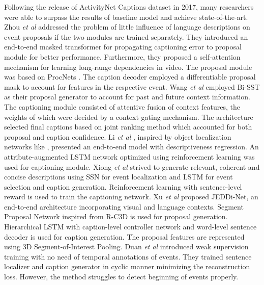 \par Following the release of ActivityNet Captions dataset in 2017, many researchers were able to surpass the results of baseline model and achieve state-of-the-art. Zhou \textit{et al} \cite{zhou2018end} addressed the problem of little influence of language descriptions on event proposals if the two modules are trained separately. They introduced an end-to-end masked transformer for propagating captioning error to proposal module for better performance. Furthermore, they proposed a self-attention mechanism for learning long-range dependencies in video. The proposal module was based on ProcNets \cite{zhou2017automatic}. The caption decoder employed a differentiable proposal mask to account for features in the respective event. Wang \textit{et al} \cite{wang2018bidirectional} employed Bi-SST as their proposal generator to account for past and future context information. The captioning module consisted of attentive fusion of context features, the weights of which were decided by a context gating mechanism. The architecture selected final captions based on joint ranking method which accounted for both proposal and caption confidence. Li \textit{et al} \cite{li2018jointly}, inspired by object localization networks like \cite{ren2016faster, liu2016ssd}, presented an end-to-end model with descriptiveness regression. An attribute-augmented LSTM network optimized using reinforcement learning was used for captioning module. Xiong \textit{et al} \cite{xiong2018forward} strived to generate relevant, coherent and concise descriptions using SSN \cite{zhao2017temporal} for event localization and LSTM for event selection and caption generation. Reinforcement learning with sentence-level reward is used to train the captioning network. Xu \textit{et al} \cite{xu2018joint} proposed JEDDi-Net, an end-to-end architecture incorporating visual and language contexts. Segment Proposal Network inspired from R-C3D \cite{xu2017rc3d} is used for proposal generation. Hierarchical LSTM with caption-level controller network and word-level sentence decoder is used for caption generation. The proposal features are represented using 3D Segment-of-Interest Pooling. Duan \textit{et al} \cite{duan2018weakly} introduced weak supervision training with no need of temporal annotations of events. They trained sentence localizer and caption generator in cyclic manner minimizing the reconstruction loss. However, the method struggles to detect beginning of events properly.

